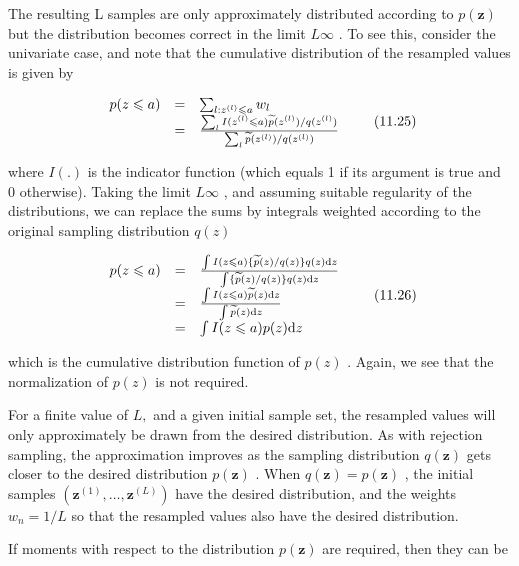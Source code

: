 \documentclass[
  10
]{article}
\begin{document}
The resulting L samples are only approximately distributed according to
\(p ( \mathbf { z } )\) but the distribution becomes correct in the
limit \(L  \infty\) . To see this, consider the univariate case, and
note that the cumulative distribution of the resampled values is given
by

\[
\begin{array}{r c l} p (z \leqslant a) & = & \sum_ {l: z ^ {(l)} \leqslant a} w _ {l} \\ & = & \frac {\sum_ {l} I (z ^ {(l)} \leqslant a) \widetilde {p} (z ^ {(l)}) / q (z ^ {(l)})}{\sum_ {l} \widetilde {p} (z ^ {(l)}) / q (z ^ {(l)})} \end{array}\tag{11.25}
\]

where \(I ( . )\) is the indicator function (which equals 1 if its
argument is true and 0 otherwise). Taking the limit \(L  \infty\) , and
assuming suitable regularity of the distributions, we can replace the
sums by integrals weighted according to the original sampling
distribution \(q ( z )\)

\[
\begin{array}{l l l} p (z \leqslant a) & = & \frac { \int I (z \leqslant a)   \{\widetilde {p} (z) / q (z) \}   q (z)   \mathrm{d} z}{ \int \{\widetilde {p} (z) / q (z) \}   q (z)   \mathrm{d} z} \\ & = & \frac { \int I (z \leqslant a) \widetilde {p} (z)   \mathrm{d} z}{ \int \widetilde {p} (z)   \mathrm{d} z} \\ & = & \int I (z \leqslant a) p (z)   \mathrm{d} z \end{array}\tag{11.26}
\]

which is the cumulative distribution function of \(p ( z )\) . Again, we
see that the normalization of \(p ( z )\) is not required.

For a finite value of \(L ,\) and a given initial sample set, the
resampled values will only approximately be drawn from the desired
distribution. As with rejection sampling, the approximation improves as
the sampling distribution \(q ( \mathbf { z } )\) gets closer to the
desired distribution \(p ( \mathbf { z } )\) . When
\(q ( \mathbf { z } ) = p ( \mathbf { z } )\) , the initial samples
\(( \mathbf { z } ^ { ( 1 ) } , \ldots , \mathbf { z } ^ { ( L ) } )\)
have the desired distribution, and the weights \(w _ { n } = 1 / L\) so
that the resampled values also have the desired distribution.

If moments with respect to the distribution \(p ( \mathbf { z } )\) are
required, then they can be
\end{document}

